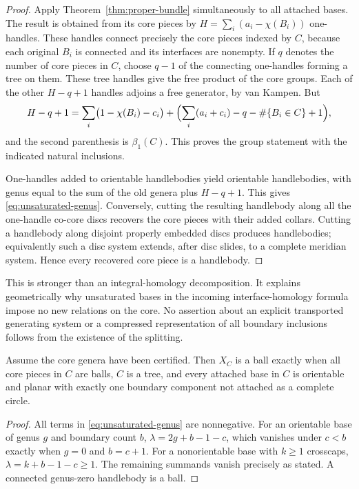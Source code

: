 \begin{proof}
Apply Theorem~\ref{thm:proper-bundle} simultaneously to all attached bases.
The result is obtained from its core pieces by
$H=\sum_i(a_i-\chi(B_i))$ one-handles.  These handles connect precisely
the core pieces indexed by $C$, because each original $B_i$ is connected
and its interfaces are nonempty.  If $q$ denotes the number of core
pieces in $C$, choose $q-1$ of the connecting one-handles forming a tree
on them.  These tree handles give the free product of the core groups.
Each of the other $H-q+1$ handles adjoins a free generator, by van Kampen.
But
\[
 H-q+1=
 \sum_i\bigl(1-\chi(B_i)-c_i\bigr)
 +\Bigl(\sum_i(a_i+c_i)-q-\#\{B_i\in C\}+1\Bigr),
\]
and the second parenthesis is $\beta_1(C)$.  This proves the group
statement with the indicated natural inclusions.

One-handles added to orientable handlebodies yield orientable handlebodies,
with genus equal to the sum of the old genera plus $H-q+1$.  This gives
\eqref{eq:unsaturated-genus}.  Conversely, cutting the resulting
handlebody along all the one-handle co-core discs recovers the core
pieces with their added collars.  Cutting a handlebody along disjoint
properly embedded discs produces handlebodies; equivalently such a disc
system extends, after disc slides, to a complete meridian system.
Hence every recovered core piece is a handlebody.
\end{proof}

This is stronger than an integral-homology decomposition.  It explains
geometrically why unsaturated bases in the incoming interface-homology
formula impose no new relations on the core.  No assertion about an
explicit transported generating system or a compressed representation of
all boundary inclusions follows from the existence of the splitting.

\begin{corollary}\label{cor:unsat-ball}
Assume the core genera have been certified.  Then $X_C$ is a ball exactly
when all core pieces in $C$ are balls, $C$ is a tree, and every attached
base in $C$ is orientable and planar with exactly one boundary component
not attached as a complete circle.
\end{corollary}
\begin{proof}
All terms in \eqref{eq:unsaturated-genus} are nonnegative.  For an orientable
base of genus $g$ and boundary count $b$,
$\lambda=2g+b-1-c$, which vanishes under $c<b$ exactly when $g=0$ and
$b=c+1$.  For a nonorientable base with $k\geq1$ crosscaps,
$\lambda=k+b-1-c\geq1$.  The remaining summands vanish precisely as stated.
A connected genus-zero handlebody is a ball.
\end{proof}

